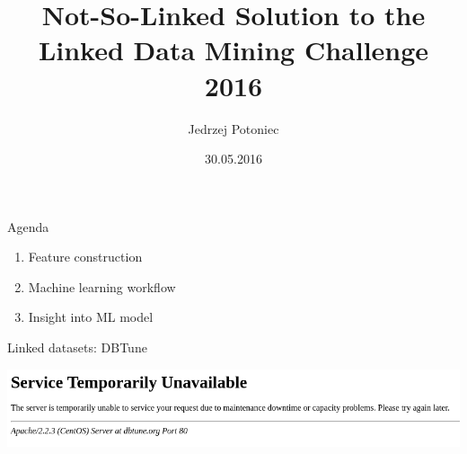 \documentclass{beamer}
\title{Not-So-Linked Solution to the\\Linked Data Mining Challenge 2016}
\author{Jedrzej Potoniec}
\date{30.05.2016}
\institute{Institute of Computing Science, Poznan University of Technology}
\begin{document}
\begin{frame}
\titlepage
\end{frame}
\begin{frame}{Agenda}
\begin{enumerate}
\item Feature construction
\item Machine learning workflow
\item Insight into ML model
\end{enumerate}
\end{frame}


%
\begin{frame}{Linked datasets: DBTune}
{
\includegraphics[width=\textwidth]{musicbrainz.png}
}
\end{frame}
\end{document}
